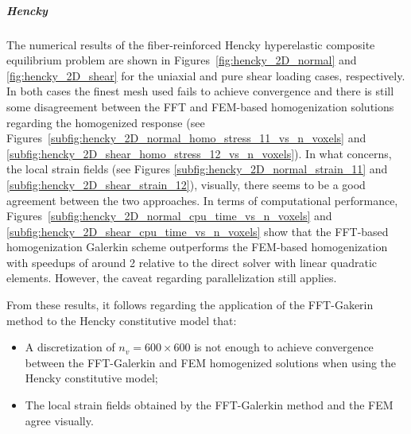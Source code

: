 \subparagraph{Hencky}

The numerical results of the fiber-reinforced Hencky hyperelastic composite equilibrium problem are shown in Figures~\ref{fig:hencky_2D_normal} and \ref{fig:hencky_2D_shear} for the uniaxial and pure shear loading cases, respectively.
In both cases the finest mesh used fails to achieve convergence and there is still some disagreement between the FFT and FEM-based homogenization solutions regarding the homogenized response (see Figures~\ref{subfig:hencky_2D_normal_homo_stress_11_vs_n_voxels} and \ref{subfig:hencky_2D_shear_homo_stress_12_vs_n_voxels}).
In what concerns, the local strain fields (see Figures \ref{subfig:hencky_2D_normal_strain_11} and \ref{subfig:hencky_2D_shear_strain_12}), visually, there seems to be a good agreement between the two approaches.
In terms of computational performance, Figures~\ref{subfig:hencky_2D_normal_cpu_time_vs_n_voxels} and \ref{subfig:hencky_2D_shear_cpu_time_vs_n_voxels} show that the FFT-based homogenization Galerkin scheme outperforms the FEM-based homogenization with speedups of around 2 relative to the direct solver with linear quadratic elements.
However, the caveat regarding parallelization still applies.

From these results, it follows regarding the application of the FFT-Gakerin method to the Hencky constitutive model that:
\begin{itemize}
  \item A discretization of \(n_v=600\times 600\) is not enough to achieve convergence between the FFT-Galerkin and FEM homogenized solutions when using the Hencky constitutive model;
  \item The local strain fields obtained by the FFT-Galerkin method and the FEM agree visually.
\end{itemize}

